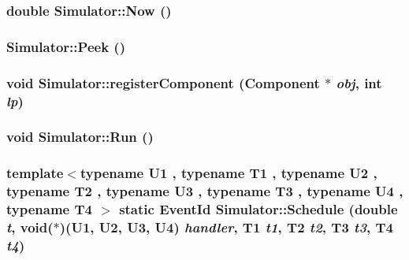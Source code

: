 \hypertarget{classSimulator_cf5727f517db6743ddf25ae7cc9a8db4}{
\subsubsection[{Now}]{\setlength{\rightskip}{0pt plus 5cm}double Simulator::Now ()}}
\label{classSimulator_cf5727f517db6743ddf25ae7cc9a8db4}


\hypertarget{classSimulator_b70ac4a1b36c3a20e7548203d22b9c17}{
\subsubsection[{Peek}]{ Simulator::Peek ()}}
\label{classSimulator_b70ac4a1b36c3a20e7548203d22b9c17}


\hypertarget{classSimulator_bc27a87849e9903771b3990c99c750bd}{
\subsubsection[{registerComponent}]{\setlength{\rightskip}{0pt plus 5cm}void Simulator::registerComponent ({\bf Component} $\ast$ {\em obj}, \/  int {\em lp})}}
\label{classSimulator_bc27a87849e9903771b3990c99c750bd}


\hypertarget{classSimulator_27e7045e7aa4e29e9d2003aaa09c8326}{
\subsubsection[{Run}]{\setlength{\rightskip}{0pt plus 5cm}void Simulator::Run ()}}
\label{classSimulator_27e7045e7aa4e29e9d2003aaa09c8326}


\hypertarget{classSimulator_a94a8a5c64b661ad4607517d84c8832e}{
\subsubsection[{Schedule}]{\setlength{\rightskip}{0pt plus 5cm}template$<$typename U1 , typename T1 , typename U2 , typename T2 , typename U3 , typename T3 , typename U4 , typename T4 $>$ static {\bf EventId} Simulator::Schedule (double {\em t}, \/  void($\ast$)(U1, U2, U3, U4) {\em handler}, \/  T1 {\em t1}, \/  T2 {\em t2}, \/  T3 {\em t3}, \/  T4 {\em t4})}}
\label{classSimulator_a94a8a5c64b661ad4607517d84c8832e}


